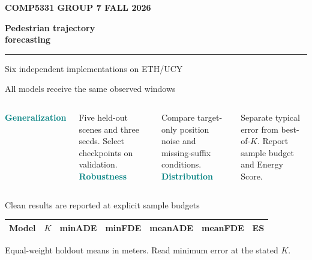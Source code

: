 \documentclass[aspectratio=169,11pt]{beamer}
\begin{document}
\begin{frame}{}
\noindent
{\small\color{Teal}\bfseries COMP5331 GROUP 7 \hfill FALL 2026\par}
\vspace{0.9cm}
{\bfseries\fontsize{29}{33}\selectfont Pedestrian trajectory\\forecasting\par}
\vspace{0.15cm}
{\color{Teal}\rule{0.94\linewidth}{0.9pt}\par}
\vspace{0.22cm}
{\large Six independent implementations on ETH/UCY\par}
\vspace{0.65cm}
{\small\color{Muted}\SubmissionStatus\par}
\end{frame}

\begin{frame}{All models receive the same observed windows}

\medskip
\begin{columns}[T,onlytextwidth]
\textcolor{Teal}{\bfseries Generalization}\par\smallskip
Five held-out scenes and three seeds. Select checkpoints on validation.
\textcolor{Teal}{\bfseries Robustness}\par\smallskip
Compare target-only position noise and missing-suffix conditions.
\textcolor{Teal}{\bfseries Distribution}\par\smallskip
Separate typical error from best-of-\(K\). Report sample budget and Energy Score.
\end{columns}
\end{frame}



\begin{frame}{Clean results are reported at explicit sample budgets}
\centering
\small
\renewcommand{\arraystretch}{1.08}
\begin{tabular}{lrrrrrr}
\toprule
Model & \(K\) & minADE & minFDE & meanADE & meanFDE & ES \\
\midrule

\end{tabular}

\vspace{0.28cm}

{\footnotesize\color{Muted}Equal-weight holdout means in meters. Read minimum error at the stated \(K\).}
\end{frame}

\end{document}
